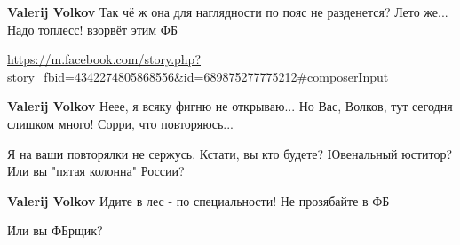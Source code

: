 \begin{itemize}
\begin{itemize}
 
\textbf{Valerij Volkov} Так чё ж она для наглядности по пояс не разденется? Лето же... Надо топлесс! взорвёт этим ФБ

 
\url{https://m.facebook.com/story.php?story_fbid=4342274805868556&id=689875277775212#composerInput}

 
\textbf{Valerij Volkov} Неее, я всяку фигню не открываю... Но Вас, Волков, тут сегодня слишком много! Сорри, что повторяюсь...

 
Я на ваши повторялки не сержусь.
Кстати, вы кто будете?
Ювенальный юститор?
Или вы "пятая колонна" России?

 
\textbf{Valerij Volkov} Идите в лес - по специальности! Не прозябайте в ФБ

 
Или вы ФБрщик?


\end{itemize}
\end{itemize}

